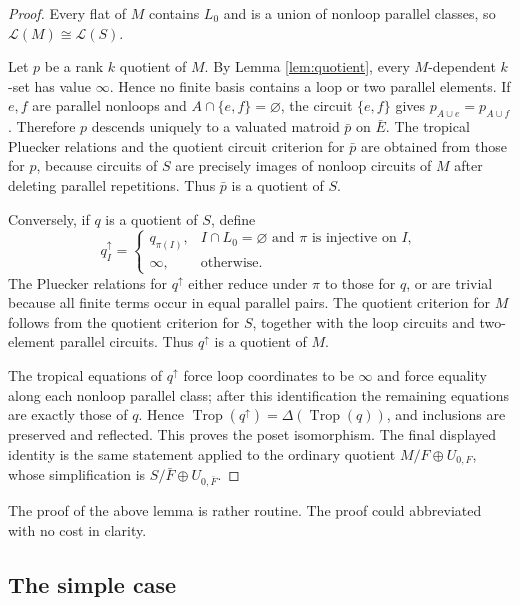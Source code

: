 \documentclass[12pt]{article}
\theoremstyle{definition}
\newcommand{\Trop}{\operatorname{Trop}}
\newcommand{\cL}{\mathcal L}
\newcommand{\review}[1]{\begin{reviewbox}#1\end{reviewbox}}
\begin{document}
\begin{proof}
Every flat of \(M\) contains \(L_0\) and is a union of nonloop parallel classes, so \(\cL(M)\cong\cL(S)\).

Let \(p\) be a rank \(k\) quotient of \(M\).  By Lemma \ref{lem:quotient}, every \(M\)-dependent \(k\)-set has value \(\infty\).  Hence no finite basis contains a loop or two parallel elements.  If \(e,f\) are parallel nonloops and \(A\cap\{e,f\}=\varnothing\), the circuit \(\{e,f\}\) gives \(p_{A\cup e}=p_{A\cup f}\).  Therefore \(p\) descends uniquely to a valuated matroid \(\bar p\) on \(\bar E\).  The tropical Pluecker relations and the quotient circuit criterion for \(\bar p\) are obtained from those for \(p\), because circuits of \(S\) are precisely images of nonloop circuits of \(M\) after deleting parallel repetitions.  Thus \(\bar p\) is a quotient of \(S\).

Conversely, if \(q\) is a quotient of \(S\), define
\[
q^\uparrow_I=
\begin{cases}
q_{\pi(I)},& I\cap L_0=\varnothing\text{ and }\pi\text{ is injective on }I,\\
\infty,&\text{otherwise}.
\end{cases}
\]
The Pluecker relations for \(q^\uparrow\) either reduce under \(\pi\) to those for \(q\), or are trivial because all finite terms occur in equal parallel pairs.  The quotient criterion for \(M\) follows from the quotient criterion for \(S\), together with the loop circuits and two-element parallel circuits.  Thus \(q^\uparrow\) is a quotient of \(M\).

The tropical equations of \(q^\uparrow\) force loop coordinates to be \(\infty\) and force equality along each nonloop parallel class; after this identification the remaining equations are exactly those of \(q\).  Hence \(\Trop(q^\uparrow)=\Delta(\Trop(q))\), and inclusions are preserved and reflected.  This proves the poset isomorphism.  The final displayed identity is the same statement applied to the ordinary quotient \(M/F\oplus U_{0,F}\), whose simplification is \(S/\bar F\oplus U_{0,\bar F}\).
\end{proof}

\review{The proof of the above lemma is rather routine. The proof could abbreviated with no cost in clarity.}

\subsection*{The simple case}
\end{document}
